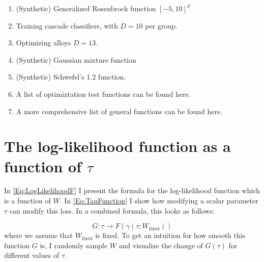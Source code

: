 \begin{enumerate}
\item \citep{Rana2017} (Synthetic) Generalized Rosenbrock function $[-5, 10]^d$
\item \citep{Rana2017} Training cascade classifiers, with $D=10$ per group.
\item \citep{Rana2017} Optimizing alloys $D=13$. 
\item \citep{Li2018} (Synthetic) Gaussian mixture function
\item \citep{Li2018} (Synthetic) Schwefel's 1.2 function.
\item \citep{OptimizationTestFunctions} A list of optimiztation test functions can be found here.
\item \citep{Jamil2013} A more comprehensive list of general functions can be found here.
\end{enumerate}

\section{The log-likelihood function as a function of $\tau$}
In \ref{Eq:LogLikelihoodF} I present the formula for the log-likelihood function which is a function of $W$.
In \ref{Eq:TauFunction} I show how modifying a scalar parameter $\tau$ can modify this loss.
In a combined formula, this looks as follows:

\begin{equation}
G: \tau \rightarrow F( \gamma(\tau; W_{ \text{fixed} }) )
\end{equation}
where we assume that $W_{ \text{fixed} }$ is fixed. 
To get an intuition for how smooth this function $G$ is, I randomly sample $W$ and visualize the change of $G(\tau)$ for different values of $\tau$.\\

